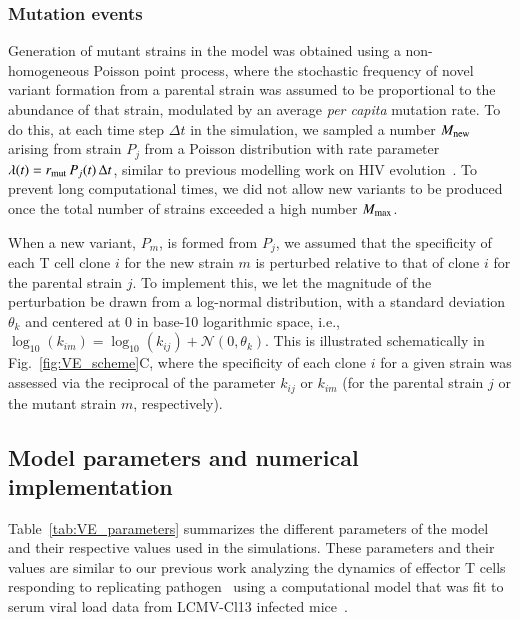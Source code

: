 \subsubsection*{Mutation events}

Generation of mutant strains in the model was obtained using a non-homogeneous Poisson point process, where the stochastic frequency of novel variant formation from a parental strain was assumed to be proportional to the abundance of that strain, modulated by an average \textit{per capita} mutation rate. To do this, at each time step $\Delta t$ in the simulation, we sampled a number $M_{\textup{new}}$ arising from strain $P_j$ from a Poisson distribution with rate parameter $\lambda (t) = r_{\textup{mut}} \, P_j(t) \, \Delta t$, similar to previous modelling work on HIV evolution~\cite{nowak1991antigenic}. To prevent long computational times, we did not allow new variants to be produced once the total number of strains exceeded a high number $M_{\textup{max}}$.

When a new variant, $P_m$, is formed from $P_j$, we assumed that the specificity of each T cell clone $i$ for the new strain $m$ is perturbed relative to that of clone $i$ for the parental strain $j$. To implement this, we let the magnitude of the perturbation be drawn from a log-normal distribution, with a standard deviation $\theta_k$ and centered at 0 in base-10 logarithmic space, i.e., $\log_{10}(k_{im}) = \log_{10}(k_{ij}) + \mathcal{N}(0,\theta_k)$. This is illustrated schematically in Fig.~\ref{fig:VE_scheme}C, where the specificity of each clone $i$ for a given strain was assessed via the reciprocal of the parameter $k_{ij}$ or $k_{im}$ (for the parental strain $j$ or the mutant strain $m$, respectively).


\subsection{Model parameters and numerical implementation}

Table~\ref{tab:VE_parameters} summarizes the different parameters of the model and their respective values used in the simulations. These parameters and their values are similar to our previous work analyzing the dynamics of effector T cells responding to replicating pathogen~\cite{jamaleddine2022chronic} using a computational model that was fit to serum viral load data from LCMV-Cl13 infected mice~\cite{wherry2003viral}.

